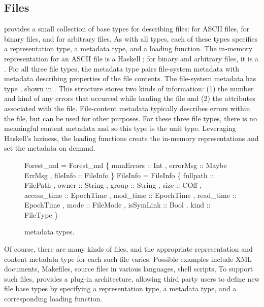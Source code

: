 \subsection{Files}
\label{sec:basics}
\forest{} provides a small collection of base types for describing
files:  for ASCII files,  for binary files, and
 for arbitrary files.  As with all \forest{} types, each of
these types specifies a representation type, a metadata type, and a
loading function.  The in-memory representation for an ASCII file is a
Haskell ; for binary and arbitrary files, it is a
.  For all three file types, the metadata type pairs
file-system metadata with metadata describing properties of the file
contents.  The file-system metadata has type , shown in
.  This structure stores two kinds of
information: (1) the number and kind of any errors that occurred while
loading the file and (2) the attributes associated with the file.
File-content metadata typically describes errors within the file, but
can be used for other purposes.  For these three file types, there is
no meaningful content metadata and so this type is the unit type.
Leveraging Haskell's laziness, the loading functions create the
in-memory representations and set the metadata on demand.

\begin{figure}
\begin{code}
 Forest_md = Forest_md 
   \{ numErrors :: Int
   , errorMsg  :: Maybe ErrMsg
   , fileInfo  :: FileInfo      
   \}
\mbox{}
 FileInfo = FileInfo 
   \{ fullpath   :: FilePath
   , owner       :: String
   , group       :: String
   , size        :: COff
   , access_time :: EpochTime
   , mod_time    :: EpochTime
   , read_time   :: EpochTime
   , mode        :: FileMode
   , isSymLink   :: Bool
   , kind        :: FileType     
   \}
\end{code}
\caption{\forest{} metadata types.}
\label{fig:forest-md}
\end{figure}

Of course, there are many kinds of files, and the appropriate
representation and content metadata type for each such file varies.
Possible examples include XML documents, Makefiles, source files in
various languages, shell scripts, \etc{}  To support such files,
\forest{} provides a plug-in architecture, allowing third party users
to define new file base types by specifying a representation type, a
metadata type, and a corresponding loading function.

